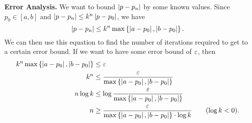 \documentclass[class=article, crop=false]{standalone}
\begin{document}
  \textbf{Error Analysis.} We want to bound $\left\lvert p - p_n \right\rvert$ by some known values. Since $p_0\in [a, b]$ and $\left\lvert p - p_n \right\rvert \leq k^n\left\lvert p - p_0 \right\rvert$, we have
  \[
    \left\lvert p - p_n \right\rvert \leq k^n \max\left\{\left\lvert a - p_0 \right\rvert, \left\lvert b - p_0 \right\rvert\right\}.
  \]
  We can then use this equation to find the number of iterations required to get to a certain error bound. If we want to have some error bound of $\varepsilon$, then
  \begin{align*}
    k^n\max \left\{\left\lvert a - p_0 \right\rvert, \left\lvert b - p_0 \right\rvert\right\} &\leq \varepsilon \\
    k^n &\leq \frac{\varepsilon}{\max\left\{\left\lvert a - p_0 \right\rvert, \left\lvert b - p_0 \right\rvert\right\}} \\
    n\log k &\leq \log \frac{\varepsilon}{\max\left\{\left\lvert a - p_0 \right\rvert, \left\lvert b - p_0 \right\rvert\right\}} \\
    n &\geq \frac{\varepsilon}{\max\left\{\left\lvert a - p_0 \right\rvert, \left\lvert b - p_0 \right\rvert\right\}\cdot \log k} \tag{$\log k < 0$}.
  \end{align*}
\end{document}
